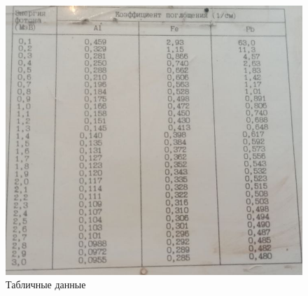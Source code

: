 \documentclass[a4paper, 12pt]{article}
\begin{document}
\begin{figure}[!h]
    \includegraphics[scale = 1.2]{energy}
    \centering
    \caption{Табличные данные}
    \label{img:energy}
\end{figure}
\end{document}
